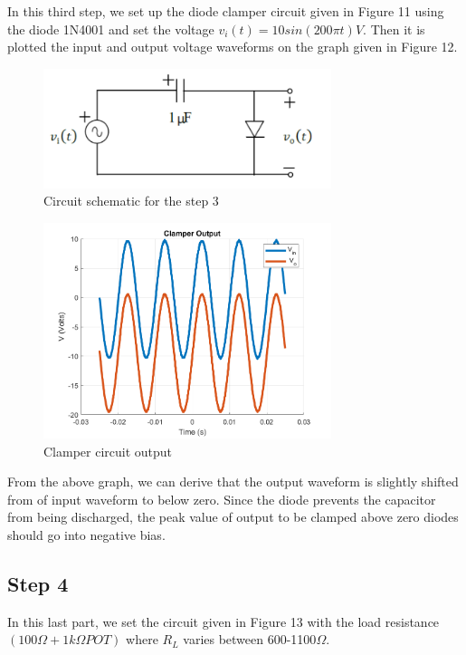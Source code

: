 \documentclass[letterpaper,12pt]{article}
\begin{document}
In this third step, we set up the diode clamper circuit given in Figure 11 using the diode 1N4001 and set the voltage \(v_i(t) = 10sin(200\pi t) V\). Then it is plotted the input and output voltage waveforms on the graph given in Figure 12.

\begin{figure}[H]
    \centering
    \includegraphics[width = 0.75\textwidth]{3_1.png}
    \caption{Circuit schematic for the step 3}
\end{figure} 
    

\begin{figure}[H]
    \centering
    \includegraphics[width = 0.75\textwidth]{3.png}
    \caption{Clamper circuit output }
\end{figure} 
    
From the above graph, we can derive that the output waveform is slightly shifted from of input waveform to below zero. Since the diode prevents the capacitor from being discharged, the peak value of output to be clamped above zero diodes should go into negative bias.



\subsection{Step 4}

In this last part, we set the circuit given in Figure 13 with the load resistance \( (100\Omega+1k\Omega POT) \) where \(R_L\) varies between 600-1100\(\Omega\).
\end{document}
